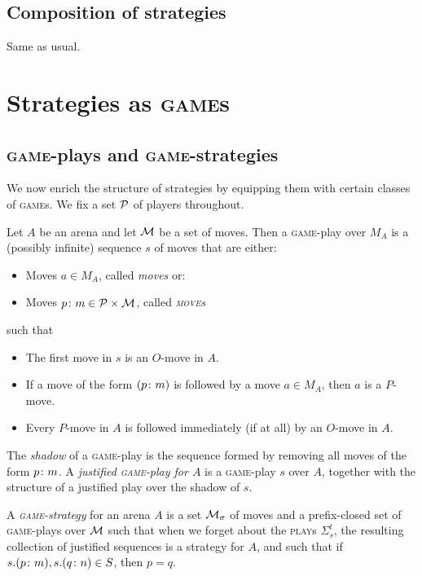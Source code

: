 \documentclass{article}
\newcommand{\game}{\textsc{game}}
\newcommand{\play}{\textsc{play}}
\newcommand{\move}{\textsc{move}}
\begin{document}
\subsection{Composition of strategies}

Same as usual.

\section{Strategies as \game{}s}

\subsection{\game{}-plays and \game{}-strategies}

We now enrich the structure of strategies by equipping them with certain classes of \game{}s. We fix a set $\P$ of players throughout.

\begin{definition}
  Let $A$ be an arena and let $\M$ be a set of moves.  
  Then a \game{}-play over $M_A$ is a (possibly infinite) sequence $s$ of moves that are either:
  \begin{itemize}
    \item Moves $a\in M_A$, called \emph{moves} or:
    \item Moves $p\from m\in \P\times\M$, called \emph{\move{}s}
  \end{itemize}
  such that
  \begin{itemize}
    \item The first move in $s$ is an $O$-move in $A$.
    \item If a move of the form $(p\from m)$ is followed by a move $a\in M_A$, then $a$ is a $P$-move.
    \item Every $P$-move in $A$ is followed immediately (if at all) by an $O$-move in $A$.
  \end{itemize}

  The \emph{shadow} of a \game{}-play is the sequence formed by removing all moves of the form $p\from m$.  
  A \emph{justified \game{}-play for $A$} is a \game{}-play $s$ over $A$, together with the structure of a justified play over the shadow of $s$.
\end{definition}

\begin{definition}
  A \emph{\game{}-strategy} for an arena $A$ is a set $\M_\sigma$ of moves and a prefix-closed set of \game{}-plays over $\M$ such that when we forget about the \play{}s $\Sigma_s^t$, the resulting collection of justified sequences is a strategy for $A$, and such that if $s.(p\from m),s.(q\from n)\in S$, then $p=q$.
\end{definition}
\end{document}
